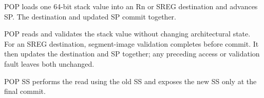 POP loads one 64-bit stack value into an Rn or SREG destination and advances SP. The destination and updated SP commit together.

POP reads and validates the stack value without changing architectural state. For an SREG destination, segment-image
validation completes before commit. It then updates the destination and SP together; any preceding access or
validation fault leaves both unchanged.

POP SS performs the read using the old SS and exposes the new SS only at the final commit.
